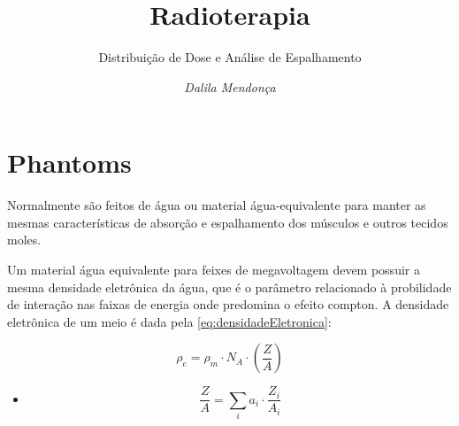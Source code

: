 \documentclass[11pt,a4paper]{article}
\title{Radioterapia}
\author{Distribuição de Dose e Análise de Espalhamento\nocite{*}}
\date{\textit{Dalila Mendonça}}
\newcounter{exemplo}
\begin{document}
	\maketitle

    \section{Phantoms}

    Normalmente são feitos de água ou material água-equivalente para manter as mesmas características de absorção e espalhamento dos músculos e outros tecidos moles.

    Um material água equivalente para feixes de megavoltagem devem possuir a mesma densidade eletrônica da água, que é o parâmetro relacionado à probilidade de interação nas faixas de energia onde predomina o efeito compton. A densidade eletrônica de um meio é dada pela \ref{eq:densidadeEletronica}:

		\begin{equation}
			\rho_e = \rho_m \cdot N_A \cdot \left(\frac{Z}{A}\right)
			\label{eq:densidadeEletronica}
		\end{equation}

		\begin{exemplo}[onde:]
			\begin{itemize}[label=\textcolor{CarnationPink}{$\star$}]
				\item \begin{equation}
							\frac{Z}{A} = \sum_{i} a_i \cdot \frac{Z_i}{A_i}
					\end{equation}
			\end{itemize}
				
			
		\end{exemplo}


\end{document}
